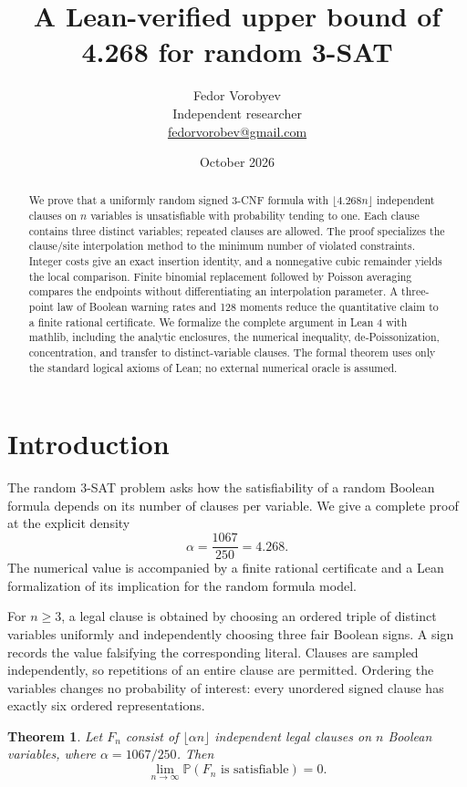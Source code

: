 \documentclass[11pt]{article}
\title{A Lean-verified upper bound of 4.268 for random 3-SAT}
\author{Fedor Vorobyev\\\small Independent researcher\\
  \small\href{mailto:fedorvorobev@gmail.com}{fedorvorobev@gmail.com}}
\date{October 2026}
\newtheorem{theorem}{Theorem}[section]
\theoremstyle{remark}
\newcommand{\Prob}{\mathbb{P}}
\begin{document}
\maketitle
\begin{abstract}
We prove that a uniformly random signed 3-CNF formula with
$\lfloor 4.268n\rfloor$ independent clauses on $n$ variables is
unsatisfiable with probability tending to one. Each clause contains three
distinct variables; repeated clauses are allowed. The proof specializes
the clause/site interpolation method to the minimum number of violated
constraints. Integer costs give an exact insertion identity, and a
nonnegative cubic remainder yields the local comparison. Finite binomial
replacement followed by Poisson averaging compares the endpoints without
differentiating an interpolation parameter. A three-point law of Boolean
warning rates and 128 moments reduce the quantitative claim to a finite
rational certificate. We formalize the complete argument in Lean 4 with
mathlib, including the analytic enclosures, the numerical inequality,
de-Poissonization, concentration, and transfer to distinct-variable clauses.
The formal theorem uses only the standard logical axioms of Lean; no
external numerical oracle is assumed.
\end{abstract}

\section{Introduction}
The random 3-SAT problem asks how the satisfiability of a random Boolean
formula depends on its number of clauses per variable. We give a complete
proof at the explicit density
\[
  \alpha=\frac{1067}{250}=4.268.
\]
The numerical value is accompanied by a finite rational certificate and a
Lean formalization of its implication for the random formula model.

For $n\geq3$, a legal clause is obtained by choosing an ordered triple of
distinct variables uniformly and independently choosing three fair
Boolean signs. A sign records the value falsifying the corresponding
literal. Clauses are sampled independently, so repetitions of an entire
clause are permitted. Ordering the variables changes no probability of
interest: every unordered signed clause has exactly six ordered
representations.

\begin{theorem}\label{thm:main}
Let $F_n$ consist of $\lfloor\alpha n\rfloor$ independent legal clauses
on $n$ Boolean variables, where $\alpha=1067/250$. Then
\[
  \lim_{n\to\infty}\Prob(F_n\text{ is satisfiable})=0.
\]
\end{theorem}
\end{document}
